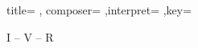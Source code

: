 \documentclass[]{leadsheet}
\begin{document}
\begin{song}[
]{
title={%
},
composer={%
},interpret={%
},key={%
}
}

\begin{schedule}
I -- V -- R
\end{schedule}

\begin{intro}
\end{intro}

\begin{verse}
\end{verse}

\begin{chorus}
\end{chorus}

\end{song}
\end{document}
